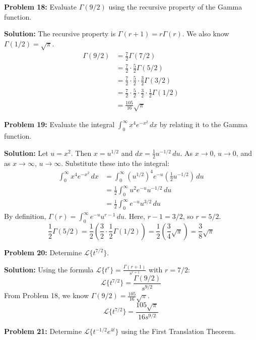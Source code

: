 \documentclass[11pt, letterpaper]{article}
\theoremstyle{definition}
\theoremstyle{remark}
\begin{document}
\vspace{1em}
\textbf{Problem 18:} Evaluate $\Gamma(9/2)$ using the recursive property of the Gamma function.

\textbf{Solution:}
The recursive property is $\Gamma(r + 1) = r\Gamma(r)$. We also know $\Gamma(1/2) = \sqrt{\pi}$.
\begin{align*}
\Gamma(9/2) &= \frac{7}{2}\Gamma(7/2) \\
&= \frac{7}{2} \cdot \frac{5}{2}\Gamma(5/2) \\
&= \frac{7}{2} \cdot \frac{5}{2} \cdot \frac{3}{2}\Gamma(3/2) \\
&= \frac{7}{2} \cdot \frac{5}{2} \cdot \frac{3}{2} \cdot \frac{1}{2}\Gamma(1/2) \\
&= \frac{105}{16}\sqrt{\pi}
\end{align*}

\vspace{1em}
\textbf{Problem 19:} Evaluate the integral $\int_0^\infty x^4 e^{-x^2} \,dx$ by relating it to the Gamma function.

\textbf{Solution:}
Let $u = x^2$. Then $x = u^{1/2}$ and $dx = \frac{1}{2}u^{-1/2} \,du$. As $x \to 0$, $u \to 0$, and as $x \to \infty$, $u \to \infty$. Substitute these into the integral:
\begin{align*}
\int_0^\infty x^4 e^{-x^2} \,dx &= \int_0^\infty (u^{1/2})^4 e^{-u} \left( \frac{1}{2}u^{-1/2} \right) \,du \\
&= \frac{1}{2} \int_0^\infty u^2 e^{-u} u^{-1/2} \,du \\
&= \frac{1}{2} \int_0^\infty e^{-u} u^{3/2} \,du
\end{align*}
By definition, $\Gamma(r) = \int_0^\infty e^{-u} u^{r-1} \,du$. Here, $r - 1 = 3/2$, so $r = 5/2$.
\[ \frac{1}{2} \Gamma(5/2) = \frac{1}{2} \left( \frac{3}{2} \cdot \frac{1}{2} \Gamma(1/2) \right) = \frac{1}{2} \left( \frac{3}{4} \sqrt{\pi} \right) = \frac{3}{8}\sqrt{\pi} \]

\vspace{1em}
\textbf{Problem 20:} Determine $\mathcal{L}\{t^{7/2}\}$.

\textbf{Solution:}
Using the formula $\mathcal{L}\{t^r\} = \frac{\Gamma(r+1)}{s^{r+1}}$ with $r = 7/2$:
\[ \mathcal{L}\{t^{7/2}\} = \frac{\Gamma(9/2)}{s^{9/2}} \]
From Problem 18, we know $\Gamma(9/2) = \frac{105}{16}\sqrt{\pi}$.
\[ \mathcal{L}\{t^{7/2}\} = \frac{105\sqrt{\pi}}{16s^{9/2}} \]

\vspace{1em}
\textbf{Problem 21:} Determine $\mathcal{L}\{t^{-1/2} e^{4t}\}$ using the First Translation Theorem.
\end{document}
